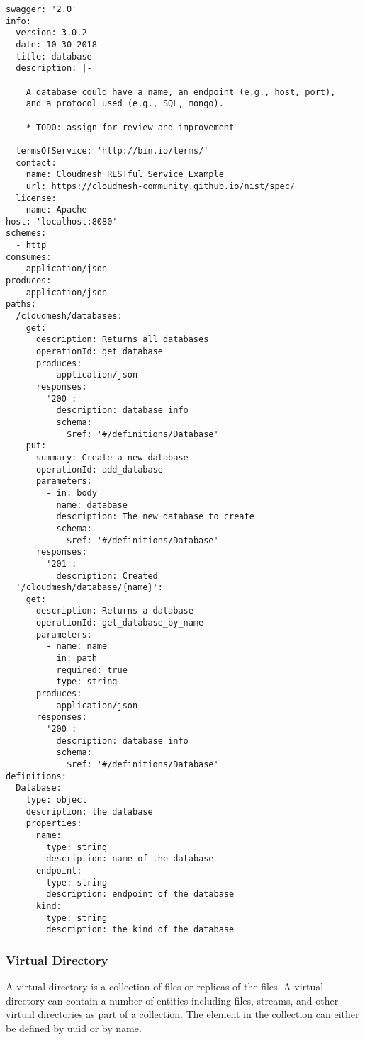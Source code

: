 \documentclass[9pt,]{article}
\begin{document}
\begin{verbatim}
swagger: '2.0'
info:
  version: 3.0.2
  date: 10-30-2018
  title: database
  description: |-
  
    A database could have a name, an endpoint (e.g., host, port),
    and a protocol used (e.g., SQL, mongo).

    * TODO: assign for review and improvement
    
  termsOfService: 'http://bin.io/terms/'
  contact:
    name: Cloudmesh RESTful Service Example
    url: https://cloudmesh-community.github.io/nist/spec/
  license:
    name: Apache
host: 'localhost:8080'
schemes:
  - http
consumes:
  - application/json
produces:
  - application/json
paths:
  /cloudmesh/databases:
    get:
      description: Returns all databases
      operationId: get_database
      produces:
        - application/json
      responses:
        '200':
          description: database info
          schema:
            $ref: '#/definitions/Database'
    put:
      summary: Create a new database
      operationId: add_database
      parameters:
        - in: body
          name: database
          description: The new database to create
          schema:
            $ref: '#/definitions/Database'
      responses:
        '201':
          description: Created
  '/cloudmesh/database/{name}':
    get:
      description: Returns a database
      operationId: get_database_by_name
      parameters:
        - name: name
          in: path
          required: true
          type: string
      produces:
        - application/json
      responses:
        '200':
          description: database info
          schema:
            $ref: '#/definitions/Database'
definitions:
  Database:
    type: object
    description: the database
    properties:
      name:
        type: string
        description: name of the database
      endpoint:
        type: string
        description: endpoint of the database
      kind:
        type: string
        description: the kind of the database
\end{verbatim}

\hypertarget{virtual-directory}{%
\subsubsection{Virtual Directory}\label{virtual-directory}}

A virtual directory is a collection of files or replicas of the files. A
virtual directory can contain a number of entities including files,
streams, and other virtual directories as part of a collection. The
element in the collection can either be defined by uuid or by name.
\end{document}
